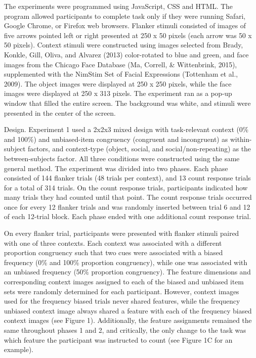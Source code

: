\documentclass[english,,man,floatsintext]{apa6}
\begin{document}
The experiments were programmed using JavaScript, CSS and HTML. The
program allowed participants to complete task only if they were running
Safari, Google Chrome, or Firefox web browsers. Flanker stimuli
consisted of images of five arrows pointed left or right presented at
250 x 50 pixels (each arrow was 50 x 50 pixels). Context stimuli were
constructed using images selected from Brady, Konkle, Gill, Oliva, and
Alvarez (2013) color-rotated to blue and green, and face images from the
Chicago Face Database (Ma, Correll, \& Wittenbrink, 2015), supplemented
with the NimStim Set of Facial Expressions (Tottenham et al., 2009). The
object images were displayed at 250 x 250 pixels, while the face images
were displayed at 250 x 313 pixels. The experiment ran as a pop-up
window that filled the entire screen. The background was white, and
stimuli were presented in the center of the screen.

Design. Experiment 1 used a 2x2x3 mixed design with task-relevant
context (0\% and 100\%) and unbiased-item congruency (congruent and
incongruent) as within-subject factors, and context-type (object,
social, and social/non-repeating) as the between-subjects factor. All
three conditions were constructed using the same general method. The
experiment was divided into two phases. Each phase consisted of 144
flanker trials (48 trials per context), and 13 count response trials for
a total of 314 trials. On the count response trials, participants
indicated how many trials they had counted until that point. The count
response trials occurred once for every 12 flanker trials and was
randomly inserted between trial 6 and 12 of each 12-trial block. Each
phase ended with one additional count response trial.

On every flanker trial, participants were presented with flanker stimuli
paired with one of three contexts. Each context was associated with a
different proportion congruency such that two cues were associated with
a biased frequency (0\% and 100\% proportion congruency), while one was
associated with an unbiased frequency (50\% proportion congruency). The
feature dimensions and corresponding context images assigned to each of
the biased and unbiased item sets were randomly determined for each
participant. However, context images used for the frequency biased
trials never shared features, while the frequency unbiased context image
always shared a feature with each of the frequency biased context images
(see Figure 1). Additionally, the feature assignments remained the same
throughout phases 1 and 2, and critically, the only change to the task
was which feature the participant was instructed to count (see Figure 1C
for an example).
\end{document}

